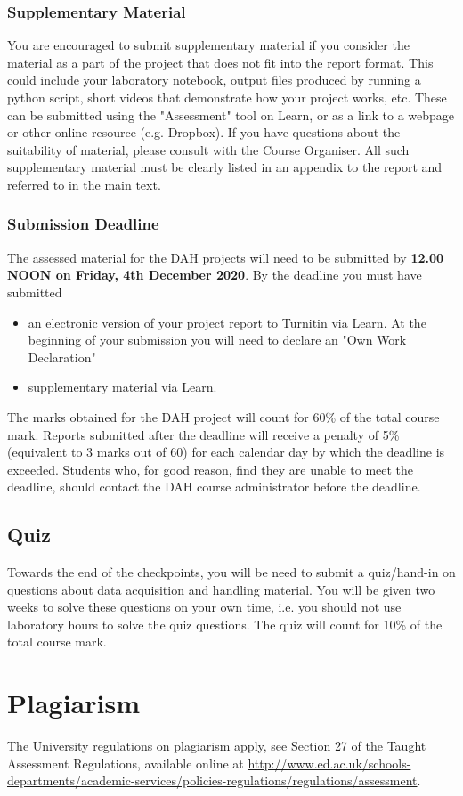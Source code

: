 \subsubsection{Supplementary Material}

You are encouraged to submit supplementary material if you consider the material as a part of the project that does not fit into the report format. 
This could include your laboratory notebook, output files produced by running a python script, short videos that demonstrate how your project works, etc.
These can be submitted using the "Assessment" tool on Learn, or as a link to a webpage or other online resource (e.g. Dropbox).
If you have questions about the suitability of material, please consult with the Course Organiser.
All such supplementary material must be clearly listed in an appendix to the report and referred to in the main text. 

\newpage
\subsubsection{Submission Deadline}

The assessed material for the DAH projects will need to be submitted by {\bf 12.00 NOON on Friday, 4th December 2020}. By the deadline you must have submitted 
\begin{itemize}
\item an electronic version of your project report to Turnitin via Learn. At the beginning of your submission you will need to declare an "Own Work Declaration"
\item supplementary material via Learn. %
\end{itemize}
The marks obtained for the DAH project will count for 60\% of the total course mark. 
Reports submitted after the deadline will receive a penalty of 5\% (equivalent to 3 marks out of 60) for each calendar day by which the deadline is exceeded.
Students who, for good reason, find they are unable to meet the deadline, should contact the DAH course administrator before the deadline.

\subsection{Quiz}

Towards the end of the checkpoints, you will be need to submit a quiz/hand-in on questions about data acquisition and handling material.
You will be given two weeks to solve these questions on your own time, i.e. you should not use laboratory hours to solve the quiz questions.
The quiz will count for 10\% of the total course mark. 

\section{Plagiarism}

The University regulations on plagiarism apply, see Section 27 of the Taught Assessment Regulations, available online at \url{http://www.ed.ac.uk/schools-departments/academic-services/policies-regulations/regulations/assessment}.
